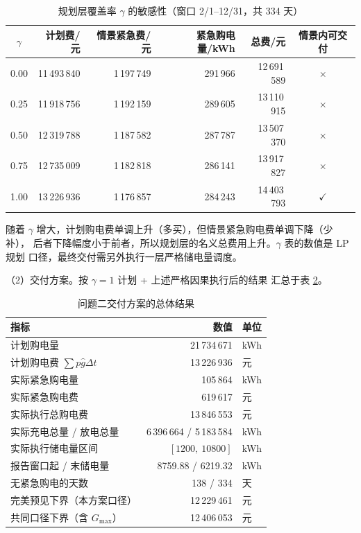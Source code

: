\documentclass[withoutpreface]{cumcmthesis}
\newcommand{\hd}[1]{\textbf{#1}}
\begin{document}
\begin{table}[!htbp]
  \centering
  \caption{规划层覆盖率 $\gamma$ 的敏感性（窗口 2/1--12/31，共 334 天）}
  \label{tab:q2gamma}
  \begin{tabular}{c r r r r c}
    \toprule[1.5pt]
    \hd{$\gamma$} & \hd{计划费/元} & \hd{情景紧急费/元} & \hd{紧急购电量/kWh}
      & \hd{总费/元} & \hd{情景内可交付}\\
    \midrule[1pt]
    0.00 & 11\,493\,840 & 1\,197\,749 & 291\,966 & 12\,691\,589 & $\times$\\
    0.25 & 11\,918\,756 & 1\,192\,159 & 289\,605 & 13\,110\,915 & $\times$\\
    0.50 & 12\,319\,788 & 1\,187\,582 & 287\,787 & 13\,507\,370 & $\times$\\
    0.75 & 12\,735\,009 & 1\,182\,818 & 286\,141 & 13\,917\,827 & $\times$\\
    1.00 & 13\,226\,936 & 1\,176\,857 & 284\,243
      & 14\,403\,793 & $\checkmark$\\
    \bottomrule[1.5pt]
  \end{tabular}
\end{table}

随着 $\gamma$ 增大，计划购电费单调上升（多买），但情景紧急购电费单调下降（少补），
后者下降幅度小于前者，所以规划层的名义总费用上升。$\gamma$ 表的数值是 LP 规划
口径，最终交付需另外执行一层严格储电量调度。

\noindent（2）交付方案。按 $\gamma=1$ 计划 + 上述严格因果执行后的结果
汇总于表 \ref{tab:q2summary}。

\begin{table}[!htbp]
  \centering
  \caption{问题二交付方案的总体结果}\label{tab:q2summary}
  \begin{tabular}{l r l}
    \toprule[1.5pt]
    \hd{指标} & \hd{数值} & \hd{单位}\\
    \midrule[1pt]
    计划购电量              & 21\,734\,671 & kWh\\
    计划购电费 $\sum p\hat g\Delta t$ & 13\,226\,936 & 元\\
    实际紧急购电量           & 105\,864 & kWh\\
    实际紧急购电费           & 619\,617 & 元\\
    实际执行总购电费 & 13\,846\,553 & 元\\
    \midrule[1pt]
    实际充电总量 / 放电总量  & 6\,396\,664 / 5\,183\,584 & kWh\\
    实际执行储电量区间       & $[1200,\ 10800]$ & kWh\\
    报告窗口起 / 末储电量    & 8759.88 / 6219.32 & kWh\\
    无紧急购电的天数         & 138 / 334 & 天\\
    \midrule[1pt]
    完美预见下界（本方案口径） & 12\,229\,461 & 元\\
    共同口径下界（含 $G_{\max}$） & 12\,406\,053 & 元\\
    \bottomrule[1.5pt]
  \end{tabular}
\end{table}
\end{document}
